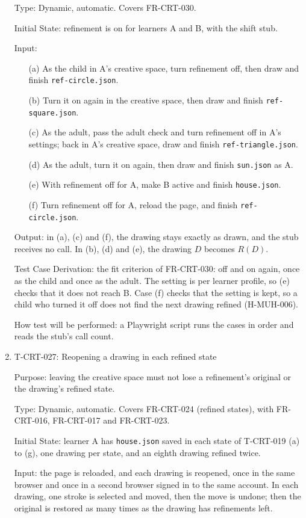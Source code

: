 \documentclass[12pt, titlepage]{article}
\newcommand{\testitem}[1]{\item #1\par\nopagebreak}
\begin{document}
\begin{enumerate}
Type: Dynamic, automatic. Covers FR-CRT-030.

Initial State: refinement is on for learners A and B, with the shift stub.

Input:
\begin{itemize}
\item[(a)] As the child in A's creative space, turn refinement off, then
draw and finish \texttt{ref-\allowbreak{}circle.json}.
\item[(b)] Turn it on again in the creative space, then draw and finish
\texttt{ref-\allowbreak{}square.json}.
\item[(c)] As the adult, pass the adult check and turn refinement off in A's
settings; back in A's creative space, draw and finish
\texttt{ref-\allowbreak{}triangle.json}.
\item[(d)] As the adult, turn it on again, then draw and finish
\texttt{sun.json} as A.
\item[(e)] With refinement off for A, make B active and finish
\texttt{house.json}.
\item[(f)] Turn refinement off for A, reload the page, and finish
\texttt{ref-\allowbreak{}circle.json}.
\end{itemize}

Output: in (a), (c) and (f), the drawing stays exactly as drawn, and the
stub receives no call. In (b), (d) and (e), the drawing $D$ becomes $R(D)$.

Test Case Derivation: the fit criterion of FR-CRT-030: off and on again, once
as the child and once as the adult. The setting is per learner profile, so
(e) checks that it does not reach B. Case (f) checks that the setting is
kept, so a child who turned it off does not find the next drawing refined
(H-MUH-006).

How test will be performed: a Playwright script runs the cases in order and
reads the stub's call count.

\testitem{T-CRT-027: Reopening a drawing in each refined state}

Purpose: leaving the creative space must not lose a refinement's original or
the drawing's refined state.

Type: Dynamic, automatic. Covers FR-CRT-024 (refined states), with
FR-CRT-016, FR-CRT-017 and FR-CRT-023.

Initial State: learner A has \texttt{house.json} saved in each state of
T-CRT-019 (a) to (g), one drawing per state, and an eighth drawing refined
twice.

Input: the page is reloaded, and each drawing is reopened, once in the same
browser and once in a second browser signed in to the same account. In each
drawing, one stroke is selected and moved, then the move is undone; then the
original is restored as many times as the drawing has refinements left.


\end{enumerate}
\end{document}
